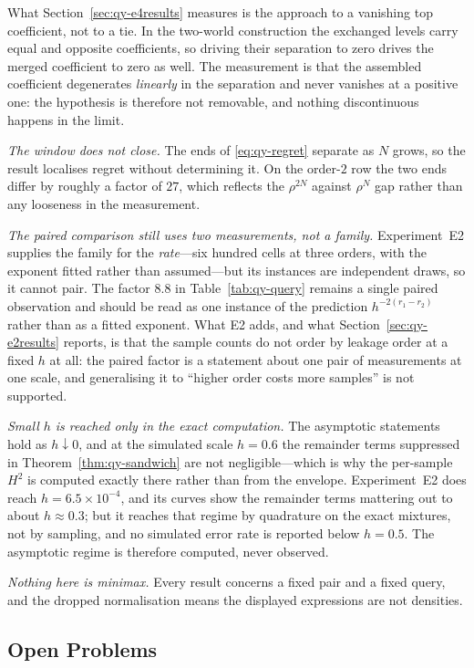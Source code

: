 \documentclass[conference]{IEEEtran}
\theoremstyle{definition}
\begin{document}
What Section~\ref{sec:qy-e4results} measures is the approach to a vanishing top coefficient, not
to a tie. In the two-world construction the exchanged levels carry equal and opposite
coefficients, so driving their separation to zero drives the merged coefficient to zero as
well. The measurement is that the assembled coefficient degenerates \emph{linearly} in the
separation and never vanishes at a positive one: the hypothesis is therefore not removable,
and nothing discontinuous happens in the limit.

\emph{The window does not close.} The ends of \eqref{eq:qy-regret} separate as $N$ grows, so the
result localises regret without determining it. On the order-$2$ row the two ends differ by
roughly a factor of $27$, which reflects the $\rho^{2N}$ against $\rho^{N}$ gap rather than
any looseness in the measurement.

\emph{The paired comparison still uses two measurements, not a family.} Experiment~E2 supplies
the family for the \emph{rate}---six hundred cells at three orders, with the exponent fitted
rather than assumed---but its instances are independent draws, so it cannot pair. The factor
$8.8$ in Table~\ref{tab:qy-query} remains a single paired observation and should be read as one
instance of the prediction $h^{-2(r_{1}-r_{2})}$ rather than as a fitted exponent. What E2
adds, and what Section~\ref{sec:qy-e2results} reports, is that the sample counts do not order by
leakage order at a fixed $h$ at all: the paired factor is a statement about one pair of
measurements at one scale, and generalising it to ``higher order costs more samples'' is not
supported.

\emph{Small $h$ is reached only in the exact computation.} The asymptotic statements hold as
$h\downarrow0$, and at the simulated scale $h=0.6$ the remainder terms suppressed in
Theorem~\ref{thm:qy-sandwich} are not negligible---which is why the per-sample $H^{2}$ is computed
exactly there rather than from the envelope. Experiment~E2 does reach $h=6.5\times10^{-4}$, and
its curves show the remainder terms mattering out to about $h\approx0.3$; but it reaches that
regime by quadrature on the exact mixtures, not by sampling, and no simulated error rate is
reported below $h=0.5$. The asymptotic regime is therefore computed, never observed.

\emph{Nothing here is minimax.} Every result concerns a fixed pair and a fixed query, and
the dropped normalisation means the displayed expressions are not densities.

\subsection{Open Problems}
\end{document}

